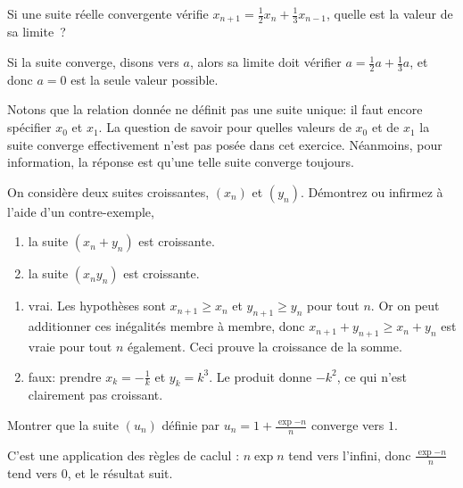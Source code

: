 \documentclass[12pt,french,oneside,a4paper]{memoir} %
\begin{document}
\begin{exo}
Si une suite réelle convergente vérifie $x_{n+1} = \frac 12 x_{n} + \frac 13 x_{n-1}$, quelle est la valeur de sa limite~?

\begin{correction}
  Si la suite converge, disons vers $a$, alors sa limite doit vérifier $a = \frac{1}{2} a + \frac{1}{3} a$, et donc $a = 0$ est la seule valeur possible.

  Notons que la relation donnée ne définit pas une suite unique: il faut encore spécifier $x_0$ et $x_{1}$. La question de savoir pour quelles valeurs de $x_{0}$ et de $x_{1}$ la suite converge effectivement n'est pas posée dans cet exercice. Néanmoins, pour information, la réponse est qu'une telle suite converge toujours.
\end{correction}
\end{exo}
\begin{exo}
On considère deux suites croissantes, $(x_n)$ et $(y_n)$. Démontrez ou infirmez à l'aide d'un contre-exemple,
\begin{enumerate}
\item la suite $(x_n+y_n)$ est croissante.
\item la suite $(x_ny_n)$ est croissante.
\end{enumerate}

\begin{correction}
  \begin{enumerate}
  \item vrai. Les hypothèses sont $x_{n+1} \geq x_{n}$  et  $y_{n+1} \geq y_{n}$ pour tout $n$. Or on peut additionner ces inégalités membre à membre, donc $x_{n+1} + y_{n+1} \geq x_{n} + y_{n}$ est vraie pour tout $n$ également. Ceci prouve la croissance de la somme.
  \item faux: prendre $x_k=-\frac{1}{k}$ et $y_k=k^3$. Le produit donne $-k^{2}$, ce qui n'est clairement pas croissant.
  \end{enumerate}
\end{correction}
\end{exo}
\begin{exo}
Montrer que la suite $(u_{n})$ définie par $u_{n} = 1 + \frac{\exp{-n}}{n}$ converge vers $1$.
\begin{correction}
  C'est une application des règles de caclul : $n \exp{n}$ tend vers l'infini, donc  $\frac{\exp{-n}}{n}$ tend vers $0$, et le résultat suit.
\end{correction}
\end{exo}
\end{document}
